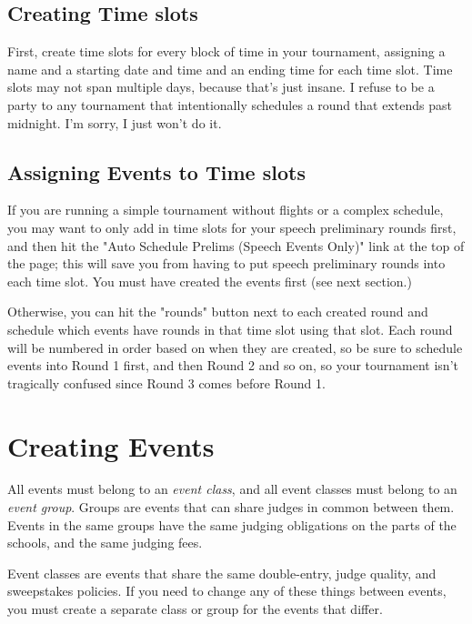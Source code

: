 \documentclass[12pt]{report} \usepackage {fullpage} \usepackage{times}
\begin{document}
 	
\subsection{Creating Time slots}

First, create time slots for every block of time in your tournament,
assigning a name and a starting date and time and an ending time for each
time slot.  Time slots may not span multiple days, because that's just
insane.  I refuse to be a party to any tournament that intentionally
schedules a round that extends past midnight.  I'm sorry, I just won't do
it.

 	
\subsection{Assigning Events to Time slots}

If you are running a simple tournament without flights or a complex
schedule, you may want to only add in time slots for your speech
preliminary rounds first, and then hit the "Auto Schedule Prelims (Speech
Events Only)" link at the top of the page;  this will save you from having
to put speech preliminary rounds into each time slot.   You must have
created the events first (see next section.)

Otherwise, you can hit the "rounds" button next to each created round and
schedule which events have rounds in that time slot using that slot.   Each
round will be numbered in order based on when they are created, so be sure
to schedule events into Round 1 first, and then Round 2 and so on, so your
tournament isn't tragically confused since Round 3 comes before Round 1. 


 	
\section{Creating Events}

All events must belong to an \emph{event class}, and all event classes must
belong to an \emph{event group}.  Groups are events that can share judges
in common between them.  Events in the same groups have the same judging
obligations on the parts of the schools, and the same judging fees. 

Event classes are events that share the same double-entry, judge quality,
and sweepstakes policies.   If you need to change any of these things
between events, you must create a separate class or group for the events
that differ.
\end{document}
